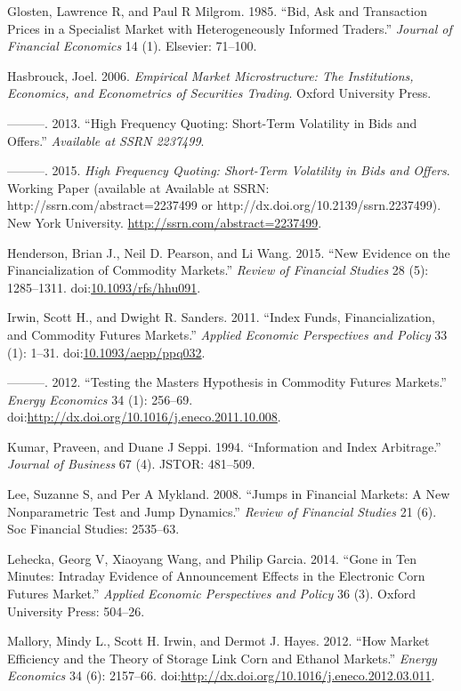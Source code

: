 \documentclass[]{elsarticle} %
\begin{document}
Glosten, Lawrence R, and Paul R Milgrom. 1985. ``Bid, Ask and
Transaction Prices in a Specialist Market with Heterogeneously Informed
Traders.'' \emph{Journal of Financial Economics} 14 (1). Elsevier:
71--100.

Hasbrouck, Joel. 2006. \emph{Empirical Market Microstructure: The
Institutions, Economics, and Econometrics of Securities Trading}. Oxford
University Press.

---------. 2013. ``High Frequency Quoting: Short-Term Volatility in Bids
and Offers.'' \emph{Available at SSRN 2237499}.

---------. 2015. \emph{High Frequency Quoting: Short-Term Volatility in
Bids and Offers}. Working Paper (available at Available at SSRN:
http://ssrn.com/abstract=2237499 or
http://dx.doi.org/10.2139/ssrn.2237499). New York University.
\href{ http://ssrn.com/abstract=2237499 }{http://ssrn.com/abstract=2237499}.

Henderson, Brian J., Neil D. Pearson, and Li Wang. 2015. ``New Evidence
on the Financialization of Commodity Markets.'' \emph{Review of
Financial Studies} 28 (5): 1285--1311.
doi:\href{http://dx.doi.org/10.1093/rfs/hhu091}{10.1093/rfs/hhu091}.

Irwin, Scott H., and Dwight R. Sanders. 2011. ``Index Funds,
Financialization, and Commodity Futures Markets.'' \emph{Applied
Economic Perspectives and Policy} 33 (1): 1--31.
doi:\href{http://dx.doi.org/10.1093/aepp/ppq032}{10.1093/aepp/ppq032}.

---------. 2012. ``Testing the Masters Hypothesis in Commodity Futures
Markets.'' \emph{Energy Economics} 34 (1): 256--69.
doi:\href{http://dx.doi.org/http://dx.doi.org/10.1016/j.eneco.2011.10.008}{http://dx.doi.org/10.1016/j.eneco.2011.10.008}.

Kumar, Praveen, and Duane J Seppi. 1994. ``Information and Index
Arbitrage.'' \emph{Journal of Business} 67 (4). JSTOR: 481--509.

Lee, Suzanne S, and Per A Mykland. 2008. ``Jumps in Financial Markets: A
New Nonparametric Test and Jump Dynamics.'' \emph{Review of Financial
Studies} 21 (6). Soc Financial Studies: 2535--63.

Lehecka, Georg V, Xiaoyang Wang, and Philip Garcia. 2014. ``Gone in Ten
Minutes: Intraday Evidence of Announcement Effects in the Electronic
Corn Futures Market.'' \emph{Applied Economic Perspectives and Policy}
36 (3). Oxford University Press: 504--26.

Mallory, Mindy L., Scott H. Irwin, and Dermot J. Hayes. 2012. ``How
Market Efficiency and the Theory of Storage Link Corn and Ethanol
Markets.'' \emph{Energy Economics} 34 (6): 2157--66.
doi:\href{http://dx.doi.org/http://dx.doi.org/10.1016/j.eneco.2012.03.011}{http://dx.doi.org/10.1016/j.eneco.2012.03.011}.
\end{document}
